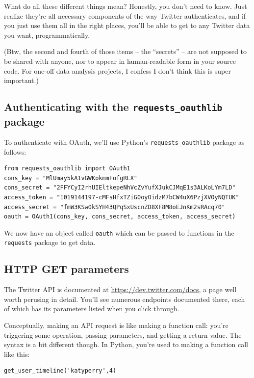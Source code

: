 What do all these different things mean? Honestly, you don't need to know.
Just realize they're all necessary components of the way Twitter
authenticates, and if you just use them all in the right places, you'll be
able to get to any Twitter data you want, programmatically.

(Btw, the second and fourth of those items -- the ``secrets'' -- are not
supposed to be shared with anyone, nor to appear in human-readable form in
your source code. For one-off data analysis projects, I confess I don't think
this is super important.)

\subsection{Authenticating with the \texttt{requests\_oauthlib} package}

To authenticate with OAuth, we'll use Python's \texttt{requests\_oauthlib}
package as follows:

\begin{Verbatim}[fontsize=\small,samepage=true,frame=none]
from requests_oauthlib import OAuth1
cons_key = "MlUmay5kA1vGWKokmmFofgRLX"
cons_secret = "2FFYCyI2rhUIEltkepeNhVcZvYufXJukCJMqE1s3ALKoLYm7LD"
access_token = "1019144197-cMFsHfxTZiG0oyOidzM7bCW4uX6PzjXVOyNQTUK"
access_secret = "fmW3KSw0kSYH43QPqSxUscnZD8XF8M8oEJnKm2sRAcq70"
oauth = OAuth1(cons_key, cons_secret, access_token, access_secret)
\end{Verbatim}

We now have an object called \texttt{oauth} which can be passed to functions
in the \texttt{requests} package to get data.

\subsection{HTTP GET parameters}

The Twitter API is documented at \url{https://dev.twitter.com/docs}, a page
well worth perusing in detail. You'll see numerous endpoints documented there,
each of which has its parameters listed when you click through.

Conceptually, making an API request is like making a function call: you're
triggering some operation, passing parameters, and getting a return value. The
syntax is a bit different though. In Python, you're used to making a function
call like this:

\begin{Verbatim}[fontsize=\small,samepage=true,frame=single]
get_user_timeline('katyperry',4)
\end{Verbatim}

